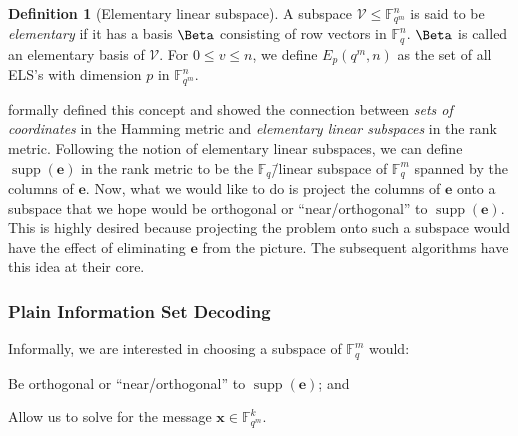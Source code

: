 \documentclass[version=last, paper=A4, parskip=half, oneside,%
toc=bibliography, toc=listof, listof=leveldown]{scrbook}
\theoremstyle{plain}
\theoremstyle{definition}
\newtheorem{definition}{Definition}
\theoremstyle{remark}
\renewcommand*{\vec}{\symbf}
\DeclareMathOperator{\supp}{supp}
\newcommand*{\FF}{\ensuremath{\mathbb{F}}}
\begin{document}
\begin{definition}[Elementary linear subspace]
  A subspace \(\mathcal{V} \le \FF_{q^m}^n\) is said to be \emph{elementary} if
  it has a basis \(\Beta\) consisting of row vectors in \(\FF_q^n\).  \(\Beta\)
  is called an elementary basis of \(\mathcal{V}\).  For \(0 \le v \le n\), we
  define \(E_p(q^m, n)\) as the set of all ELS's with dimension \(p\) in
  \(\FF_{q^m}^n\).
\end{definition}

\Textcite{GY08} formally defined this concept and showed the connection between
\emph{sets of coordinates} in the Hamming metric and \emph{elementary linear
  subspaces} in the rank metric.  Following the notion of elementary linear
subspaces, we can define \(\supp(\vec{e})\) in the rank metric to be the
\(\FF_q\)\=/linear subspace of \(\FF_q^m\) spanned by the columns of
\(\vec{e}\).  Now, what we would like to do is project the columns of
\(\vec{e}\) onto a subspace that we hope would be orthogonal or
\enquote{near\-/orthogonal} to \(\supp(\vec{e})\).  This is highly desired
because projecting the problem onto such a subspace would have the effect of
eliminating \(\vec{e}\) from the picture.  The subsequent algorithms have this
idea at their core.

\subsubsection{Plain Information Set Decoding}

Informally, we are interested in choosing a subspace of \(\FF_q^m\) would:
\begin{conditions}
\item\label{cond:orthogonality} Be orthogonal or \enquote{near\-/orthogonal} to
  \(\supp(\vec{e})\); and
\item\label{cond:determinedness} Allow us to solve for the message
  \(\vec{x} \in \FF_{q^m}^k\).
\end{conditions}
\end{document}
